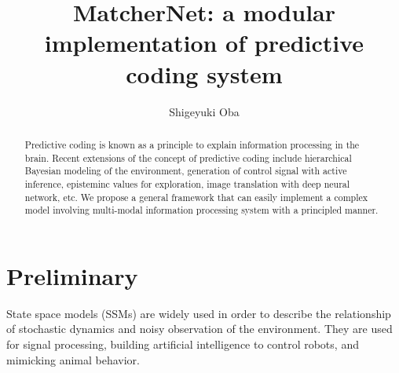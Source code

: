 \documentclass{article}
\begin{document}
\title{MatcherNet: a modular implementation of predictive coding system}
\author{Shigeyuki Oba}

%
%
%
%
%

\maketitle              %

\begin{abstract}
Predictive coding is known as a principle to explain information processing in the brain.
Recent extensions of the concept of predictive coding include hierarchical Bayesian modeling of the environment, generation of control signal with active inference, episteminc values for exploration, image translation with deep neural network, etc. 
We propose a general framework that can easily implement a complex model involving multi-modal information processing system with a principled manner.  

\end{abstract}
%

\newcommand{\vect}[1]{{\bf #1}}
\newcommand{\vA}[0]{\vect{A}}
\newcommand{\vB}[0]{\vect{B}}
\newcommand{\vC}[0]{\vect{C}}
\newcommand{\vF}[0]{\vect{F}}
\newcommand{\vK}[0]{\vect{K}}
\newcommand{\vS}[0]{\vect{S}}
\newcommand{\vQ}[0]{\vect{Q}}
\newcommand{\vR}[0]{\vect{R}}
\newcommand{\T}[0]{{{}^{\rm T}}}
\newcommand{\vu}[0]{\vect{u}}
\newcommand{\vv}[0]{\vect{v}}
\newcommand{\vw}[0]{\vect{w}}
\newcommand{\vx}[0]{\vect{x}}
\newcommand{\vy}[0]{\vect{y}}
\newcommand{\vz}[0]{\vect{z}}
\newcommand{\vmu}{{\boldsymbol{\mu}}}
\newcommand{\vSigma}{{\boldsymbol{\Sigma}}}
\newcommand{\Real}{\mathbb{R}}
\newcommand{\Normal}{{\mathbf{N}}}

\section{Preliminary}
State space models (SSMs) are widely used in order to describe the relationship of stochastic dynamics and noisy observation of the environment. They are used for signal processing, building artificial intelligence to control robots, and mimicking animal behavior. 
\end{document}
